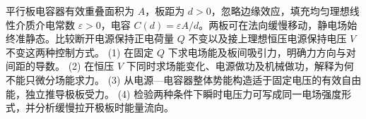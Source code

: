 平行板电容器有效重叠面积为 \(A\)，板距为 \(d>0\)，忽略边缘效应，填充均匀理想线性介质介电常数 \(\varepsilon>0\)，电容 \(C(d)=\varepsilon A/d\)。两板可在法向缓慢移动，静电场始终准静态。比较断开电源保持正电荷量 \(Q\) 不变以及接上理想恒压电源保持电压 \(V\) 不变这两种控制方式。
(1) 在固定 \(Q\) 下求电场能及板间吸引力，明确力方向与对间距的导数。
(2) 在恒压 \(V\) 下同时求场能变化、电源做功及机械做功，解释为何不能只微分场能求力。
(3) 从电源—电容器整体势能构造适于固定电压的有效自由能，独立推导极板受力。
(4) 检验两种条件下瞬时电压力可写成同一电场强度形式，并分析缓慢拉开极板时能量流向。
